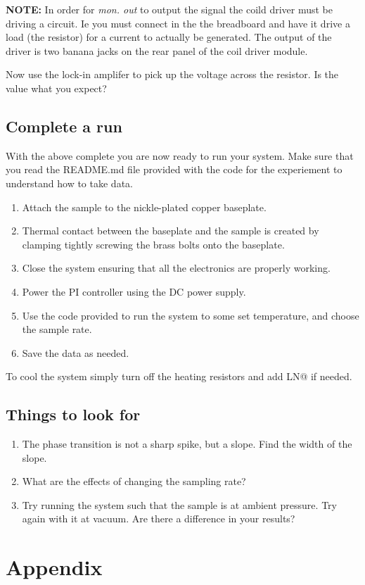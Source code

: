 \documentclass{apl-guide}
\begin{document}
\textbf{NOTE:} In order for \emph{mon. out} to output the signal the coild
driver must be driving a circuit. Ie you must connect in the the breadboard and
have it drive a load (the resistor) for a current to actually be generated. The
output of the driver is two banana jacks on the rear panel of the coil driver
module.

Now use the lock-in amplifer to pick up the voltage across the resistor. Is the
value what you expect?

\subsection{Complete a run}
With the above complete you are now ready to run your system. Make sure that you
read the README.md file provided with the code for the experiement to understand
how to take data. 
\begin{enumerate}
  \item Attach the sample to the nickle-plated copper baseplate. 
  \item Thermal contact between the baseplate and the sample is created by
    clamping tightly screwing the brass bolts onto the baseplate. 
  \item Close the system ensuring that all the electronics are properly working. 
  \item Power the PI controller using the DC power supply.
  \item Use the code provided to run the system to some set temperature, and
    choose the sample rate.
  \item Save the data as needed. 
\end{enumerate}

To cool the system simply turn off the heating resistors and add LN@ if needed. 

\subsection{Things to look for}
\begin{enumerate}
  \item The phase transition is not a sharp spike, but a slope. Find the width
    of the slope. 
  \item What are the effects of changing the sampling rate?
  \item Try running the system such that the sample is at ambient pressure. Try
    again with it at vacuum. Are there a difference in your results?
\end{enumerate}

\section{Appendix}

\end{document}
